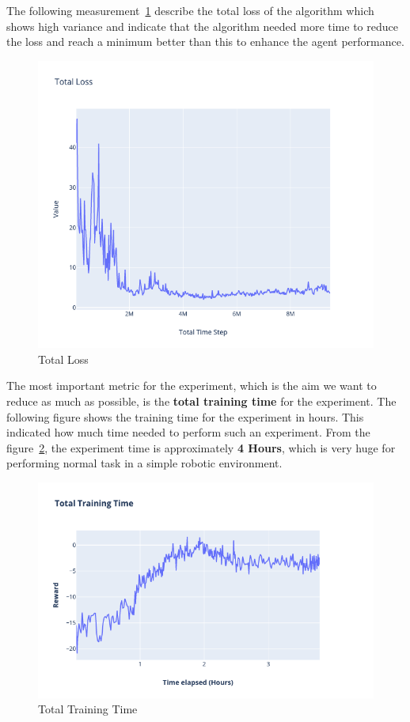 The following measurement~\ref{fig:1st_exp_total_loss} describe the total loss of the algorithm which shows high variance and indicate that the algorithm needed more time to reduce the loss and reach a minimum better than this to enhance the agent performance.
\begin{figure}[H]
	\centering
	\includegraphics[width=\linewidth]{figures/exps/1st_exp/total_loss}
	\caption{Total Loss}
	\label{fig:1st_exp_total_loss}
\end{figure}

The most important metric for the experiment, which is the aim we want to reduce as much as possible, is the \textbf{total training time} for the experiment. The following figure shows the training time for the experiment in hours. This indicated how much time needed to perform such an experiment. From the figure~\ref{fig:1st_exp_total_training_time}, the experiment time is approximately \textbf{4 Hours}, which is very huge for performing normal task in a simple robotic environment.
\begin{figure}[H]
	\centering
	\includegraphics[width=\linewidth]{figures/exps/1st_exp/total_time}
	\caption{Total Training Time}
	\label{fig:1st_exp_total_training_time}
\end{figure}

